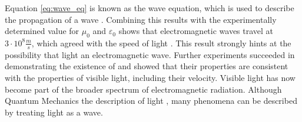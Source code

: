 Equation \ref{eq:wave_eq} is known as the wave equation, which is used
to describe the propagation of a wave \DIFaddbegin {}\DIFaddend . Combining
this results with the experimentally determined value for $\mu_0$ and
$\varepsilon_0$ shows that electromagnetic \DIFaddbegin {}\DIFaddend waves travel at \(3\cdot
10^8 \frac{m}{s}\), which agreed with the \DIFdelbegin {}\DIFdelend \DIFaddbegin {}\DIFaddend speed of light
\cite{Froome1971} \DIFaddbegin {}\DIFaddend . This
result strongly hints at the possibility that light \DIFdelbegin {}\DIFdelend \DIFaddbegin {}\DIFaddend an
electromagnetic wave. Further experiments succeeded in demonstrating
the existence of \DIFdelbegin {}\DIFdelend \DIFaddbegin {}\DIFaddend and
showed that their properties are consistent with the properties of
visible light, including their velocity. Visible light has now become
part of the broader spectrum of electromagnetic radiation. Although
Quantum Mechanics \DIFdelbegin {}\DIFdelend \DIFaddbegin {}\DIFaddend the description of light \DIFdelbegin {}\DIFdelend \DIFaddbegin {}\DIFaddend , many
phenomena can be described by treating light as a \DIFaddbegin {}\DIFaddend wave.

